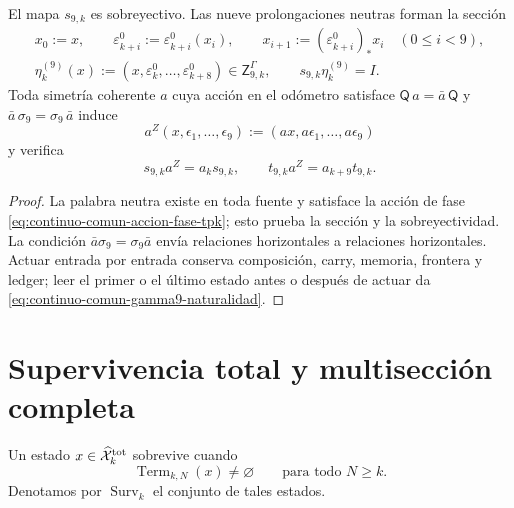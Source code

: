 \begin{proposition}
\label{prop:continuo-comun-gamma9-total-natural}
El mapa \(s_{9,k}\) es sobreyectivo. Las nueve prolongaciones neutras forman
la sección
\begin{equation}
\label{eq:continuo-comun-gamma9-seccion-neutra}
 \begin{gathered}
 x_0:=x,\qquad
 \varepsilon^0_{k+i}:=\varepsilon^0_{k+i}(x_i),\qquad
 x_{i+1}:=(\varepsilon^0_{k+i})_*x_i\quad(0\leq i<9),\\
 \eta^{(9)}_k(x):=
 (x,\varepsilon^0_k,\ldots,\varepsilon^0_{k+8})
 \in\mathsf Z^{\Gamma}_{9,k},
 \qquad s_{9,k}\eta^{(9)}_k=I.
 \end{gathered}
\end{equation}
Toda simetría coherente \(a\) cuya acción en el odómetro satisface
\(\mathsf Q\,a=\bar a\,\mathsf Q\) y
\(\bar a\,\sigma_9=\sigma_9\,\bar a\) induce
\[
 a^Z(x,\epsilon_1,\ldots,\epsilon_9)
 :=(a x,a\epsilon_1,\ldots,a\epsilon_9)
\]
y verifica
\begin{equation}
\label{eq:continuo-comun-gamma9-naturalidad}
 s_{9,k}a^Z=a_ks_{9,k},
 \qquad
 t_{9,k}a^Z=a_{k+9}t_{9,k}.
\end{equation}
\end{proposition}

\begin{proof}
La palabra neutra existe en toda fuente y satisface la acción de fase
\eqref{eq:continuo-comun-accion-fase-tpk}; esto prueba la sección y la
sobreyectividad. La condición
\(\bar a\sigma_9=\sigma_9\bar a\) envía relaciones horizontales a relaciones
horizontales. Actuar entrada por entrada conserva composición, carry,
memoria, frontera y ledger; leer el primer o el último estado antes o después
de actuar da \eqref{eq:continuo-comun-gamma9-naturalidad}.
\end{proof}

\section{Supervivencia total y multisección completa}
\label{sec:continuo-comun-supervivencia}

\begin{definition}
\label{def:continuo-comun-supervivencia}
Un estado \(x\in\widehat{\mathcal X}^{\rm tot}_k\) sobrevive cuando
\begin{equation}
\label{eq:continuo-comun-supervivencia}
 \operatorname{Term}_{k,N}(x)\neq\varnothing
 \qquad\text{para todo }N\geq k.
\end{equation}
Denotamos por \(\operatorname{Surv}_k\) el conjunto de tales estados.
\end{definition}

